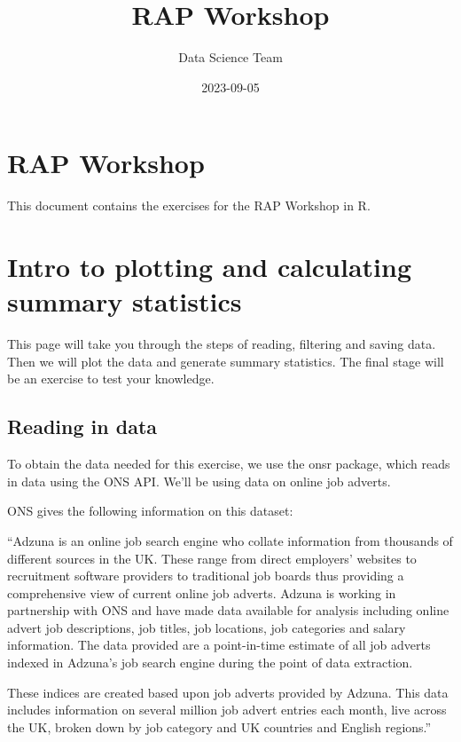 \documentclass[
]{book}
\title{RAP Workshop}
\author{Data Science Team}
\date{2023-09-05}
\begin{document}
\maketitle

{
\setcounter{tocdepth}{1}
\tableofcontents
}
\hypertarget{rap-workshop}{%
\chapter{RAP Workshop}\label{rap-workshop}}

This document contains the exercises for the RAP Workshop in R.

\hypertarget{intro-to-plotting-and-calculating-summary-statistics}{%
\chapter{Intro to plotting and calculating summary statistics}\label{intro-to-plotting-and-calculating-summary-statistics}}

This page will take you through the steps of reading, filtering and saving data. Then we will plot the data and generate summary statistics. The final stage will be an exercise to test your knowledge.

\hypertarget{reading-in-data}{%
\section{Reading in data}\label{reading-in-data}}

To obtain the data needed for this exercise, we use the onsr package, which reads in data using the ONS API. We'll be using data on online job adverts.

ONS gives the following information on this dataset:

``Adzuna is an online job search engine who collate information from thousands of different sources in the UK. These range from direct employers' websites to recruitment software providers to traditional job boards thus providing a comprehensive view of current online job adverts. Adzuna is working in partnership with ONS and have made data available for analysis including online advert job descriptions, job titles, job locations, job categories and salary information. The data provided are a point-in-time estimate of all job adverts indexed in Adzuna's job search engine during the point of data extraction.

These indices are created based upon job adverts provided by Adzuna. This data includes information on several million job advert entries each month, live across the UK, broken down by job category and UK countries and English regions.''
\end{document}
